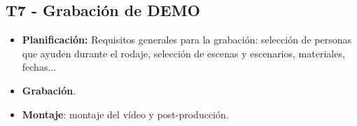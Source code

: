 \subsection{T7 - Grabación de DEMO}
\begin{itemize}
	\item \textbf{Planificación:} Requisitos generales para la grabación: selección de personas que ayuden durante el rodaje, selección de escenas y escenarios, materiales, fechas...
	\item \textbf{Grabación}.
	\item \textbf{Montaje}: montaje del vídeo y post-producción.
\end{itemize}